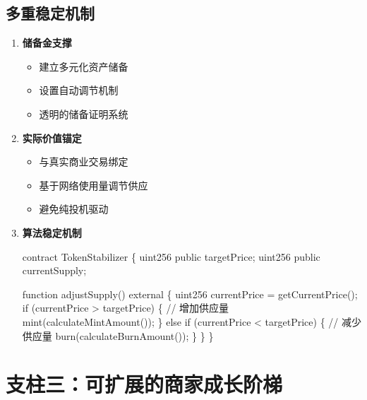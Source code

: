 \documentclass[
  Letterpaper,
]{scrbook}
\newenvironment{Shaded}{\begin{snugshade}}{\end{snugshade}}
\newcommand{\NormalTok}[1]{\textcolor[rgb]{0.00,0.23,0.31}{#1}}
\providecommand{\tightlist}{%
  \setlength{\itemsep}{0pt}\setlength{\parskip}{0pt}}
\begin{document}
\subsection{多重稳定机制}\label{ux591aux91cdux7a33ux5b9aux673aux5236}

\begin{enumerate}
\def\labelenumi{\arabic{enumi}.}
\item
  \textbf{储备金支撑}

  \begin{itemize}
  \tightlist
  \item
    建立多元化资产储备
  \item
    设置自动调节机制
  \item
    透明的储备证明系统
  \end{itemize}
\item
  \textbf{实际价值锚定}

  \begin{itemize}
  \tightlist
  \item
    与真实商业交易绑定
  \item
    基于网络使用量调节供应
  \item
    避免纯投机驱动
  \end{itemize}
\item
  \textbf{算法稳定机制}

\begin{Shaded}
\begin{Highlighting}[]
\NormalTok{contract TokenStabilizer \{}
\NormalTok{    uint256 public targetPrice;}
\NormalTok{    uint256 public currentSupply;}

\NormalTok{    function adjustSupply() external \{}
\NormalTok{        uint256 currentPrice = getCurrentPrice();}
\NormalTok{        if (currentPrice \textgreater{} targetPrice) \{}
\NormalTok{            // 增加供应量}
\NormalTok{            mint(calculateMintAmount());}
\NormalTok{        \} else if (currentPrice \textless{} targetPrice) \{}
\NormalTok{            // 减少供应量}
\NormalTok{            burn(calculateBurnAmount());}
\NormalTok{        \}}
\NormalTok{    \}}
\NormalTok{\}}
\end{Highlighting}
\end{Shaded}
\end{enumerate}

\section{支柱三：可扩展的商家成长阶梯}\label{ux652fux67f1ux4e09ux53efux6269ux5c55ux7684ux5546ux5bb6ux6210ux957fux9636ux68af}
\end{document}
